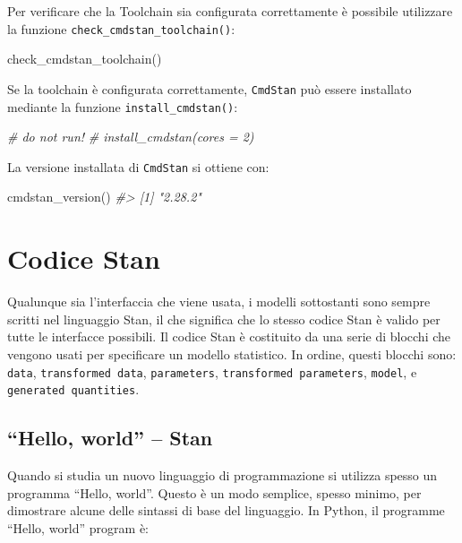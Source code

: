 \documentclass[
  10pt,
  italian,
  a4paper,
  extrafontsizes,onecolumn,openright
  ]{memoir}
\newenvironment{Shaded}{\begin{snugshade}}{\end{snugshade}}
\newcommand{\CommentTok}[1]{\textcolor[rgb]{0.56,0.35,0.01}{\textit{#1}}}
\newcommand{\FunctionTok}[1]{\textcolor[rgb]{0.00,0.00,0.00}{#1}}
\newcommand{\NormalTok}[1]{#1}
\newlength{\rf}
\begin{document}
Per verificare che la Toolchain sia configurata correttamente è possibile utilizzare la funzione \texttt{check\_cmdstan\_toolchain()}:

\begin{Shaded}
\begin{Highlighting}[]
\FunctionTok{check\_cmdstan\_toolchain}\NormalTok{()}
\end{Highlighting}
\end{Shaded}

\noindent
Se la toolchain è configurata correttamente, \texttt{CmdStan} può essere installato mediante la funzione \texttt{install\_cmdstan()}:

\begin{Shaded}
\begin{Highlighting}[]
\CommentTok{\# do not run!}
\CommentTok{\# install\_cmdstan(cores = 2)}
\end{Highlighting}
\end{Shaded}

\noindent
La versione installata di \texttt{CmdStan} si ottiene con:

\begin{Shaded}
\begin{Highlighting}[]
\FunctionTok{cmdstan\_version}\NormalTok{()}
\CommentTok{\#\textgreater{} [1] "2.28.2"}
\end{Highlighting}
\end{Shaded}

\hypertarget{codice-stan}{%
\section{Codice Stan}\label{codice-stan}}

Qualunque sia l'interfaccia che viene usata, i modelli sottostanti sono sempre scritti nel linguaggio Stan, il che significa che lo stesso codice Stan è valido per tutte le interfacce possibili. Il codice Stan è costituito da una serie di blocchi che vengono usati per specificare un modello statistico. In ordine, questi blocchi sono: \texttt{data}, \texttt{transformed\ data}, \texttt{parameters}, \texttt{transformed\ parameters}, \texttt{model}, e \texttt{generated\ quantities}.

\hypertarget{hello-world-stan}{%
\subsection{``Hello, world'' -- Stan}\label{hello-world-stan}}

Quando si studia un nuovo linguaggio di programmazione si utilizza spesso un programma ``Hello, world''. Questo è un modo semplice, spesso minimo, per dimostrare alcune delle sintassi di base del linguaggio. In Python, il programme ``Hello, world'' program è:
\end{document}
